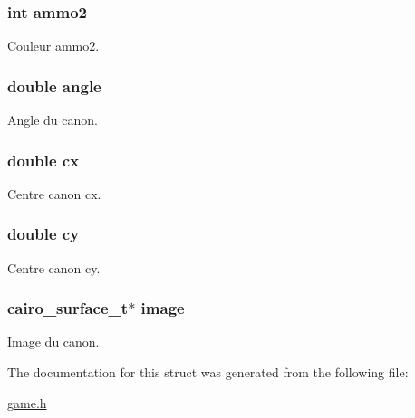 \subsubsection[{\texorpdfstring{ammo2}{ammo2}}]{\setlength{\rightskip}{0pt plus 5cm}int ammo2}\hypertarget{struct_canon_a4126da3ee54341be6c362c00abc4dd76}{}\label{struct_canon_a4126da3ee54341be6c362c00abc4dd76}
Couleur ammo2. 
\subsubsection[{\texorpdfstring{angle}{angle}}]{\setlength{\rightskip}{0pt plus 5cm}double angle}\hypertarget{struct_canon_a79dea7ed146af26ff4a0ba4bf5c83eee}{}\label{struct_canon_a79dea7ed146af26ff4a0ba4bf5c83eee}
Angle du canon. 
\subsubsection[{\texorpdfstring{cx}{cx}}]{\setlength{\rightskip}{0pt plus 5cm}double cx}\hypertarget{struct_canon_ac176cb816ac192bd8ec2f73c40b43309}{}\label{struct_canon_ac176cb816ac192bd8ec2f73c40b43309}
Centre canon cx. 
\subsubsection[{\texorpdfstring{cy}{cy}}]{\setlength{\rightskip}{0pt plus 5cm}double cy}\hypertarget{struct_canon_a2d6a093e4a6fe06658d3d01563d028c9}{}\label{struct_canon_a2d6a093e4a6fe06658d3d01563d028c9}
Centre canon cy. 
\subsubsection[{\texorpdfstring{image}{image}}]{\setlength{\rightskip}{0pt plus 5cm}cairo\+\_\+surface\+\_\+t$\ast$ image}\hypertarget{struct_canon_a4d3180badf477a42a7f55128b348f141}{}\label{struct_canon_a4d3180badf477a42a7f55128b348f141}
Image du canon. 

The documentation for this struct was generated from the following file\+:\begin{DoxyCompactItemize}
\item 
\hyperlink{game_8h}{game.\+h}\end{DoxyCompactItemize}
